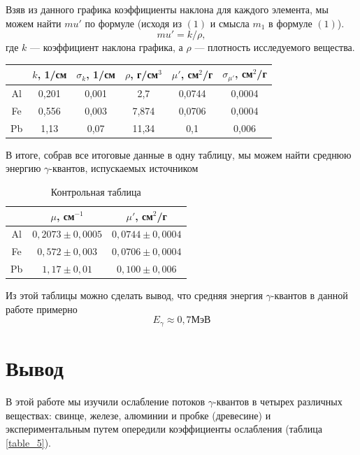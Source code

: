\documentclass[a4paper, 12pt]{article}%
\begin{document}
Взяв из данного графика коэффициенты наклона для каждого элемента, мы можем найти $mu'$ по формуле (исходя из $(1)$ и смысла $m_1$ в формуле $(1)$).
\[mu' = k/\rho,\]
где $k$ --- коэффициент наклона графика, а $\rho$ --- плотность исследуемого вещества.

\begin{table}[h]
\begin{center}
\begin{tabular}{|c|c|c|c|c|c|}
\hline
   & $k$, 1/см & $\sigma_k$, 1/см & $\rho$, г/см$^3$ & $\mu'$, см$^2$/г & $\sigma_{\mu'}$, см$^2$/г \\ \hline
Al & 0,201     & 0,001            & 2,7              & 0,0744           & 0,0004                    \\ \hline
Fe & 0,556     & 0,003            & 7,874            & 0,0706           & 0,0004                    \\ \hline
Pb & 1,13      & 0,07             & 11,34            & 0,1              & 0,006                     \\ \hline
\end{tabular}
\end{center}
\end{table}
В итоге, собрав все итоговые данные в одну таблицу, мы можем найти среднюю энергию $\gamma$-квантов, испускаемых источником
\begin{table}[h]
\begin{center}
\begin{tabular}{|c|c|c|}
\hline
   & $\mu$, см$^{-1}$  & $\mu'$, см$^2$/г   \\ \hline
Al & $0,2073\pm0,0005$ & $0,0744\pm0,0004$ \\ \hline
Fe & $0,572\pm0,003$   & $0,0706\pm0,0004$ \\ \hline
Pb & $1,17\pm0,01$     & $0,100\pm0,006$   \\ \hline
\end{tabular}
\caption{Контрольная таблица}
\end{center}
\end{table}

Из этой таблицы можно сделать вывод, что средняя энергия $\gamma$-квантов в данной работе примерно 
\[E_{\gamma} \approx  0,7 \text{МэВ}\]
\section*{Вывод}
В этой работе мы изучили ослабление потоков $\gamma$-квантов в четырех различных веществах: свинце, железе, алюминии и пробке (древесине) и экспериментальным путем опередили коэффициенты ослабления (таблица \ref{table_5}). 
\end{document}
